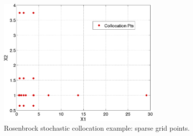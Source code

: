 \begin{figure}[ht!]
  \centering
  \includegraphics[height=2.5in]{images/rosen_sc_pts}
  \caption{Rosenbrock stochastic collocation example: sparse grid points.}
  \label{uq:figure11b}
\end{figure}

